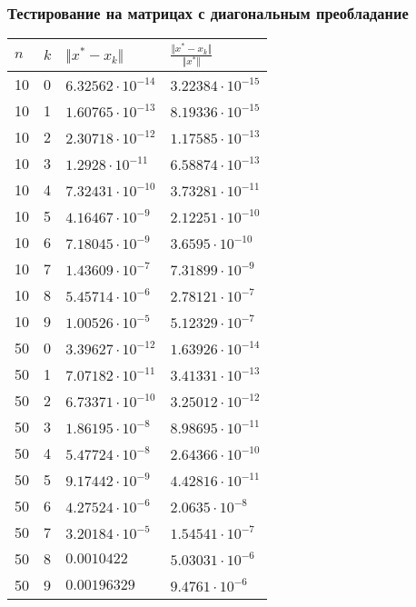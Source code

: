\documentclass[english]{article}
\begin{document}
\subsubsection{Тестирование на матрицах с диагональным преобладание}
\begin{center}
  \begin{longtable}{l|l|l|l}
    \(n\) & \(k\) & \(\Vert x^* - x_k \Vert\) & \(\frac{\Vert x^* - x_k \Vert}{\Vert x^* \Vert}\) \\
    \hline
    10 & 0 & \(6.32562\cdot 10^{-14}\) & \(3.22384\cdot 10^{-15}\) \\
    10 & 1 & \(1.60765\cdot 10^{-13}\) & \(8.19336\cdot 10^{-15}\) \\
    10 & 2 & \(2.30718\cdot 10^{-12}\) & \(1.17585\cdot 10^{-13}\) \\
    10 & 3 & \(1.2928\cdot 10^{-11}\) & \(6.58874\cdot 10^{-13}\) \\
    10 & 4 & \(7.32431\cdot 10^{-10}\) & \(3.73281\cdot 10^{-11}\) \\
    10 & 5 & \(4.16467\cdot 10^{-9}\) & \(2.12251\cdot 10^{-10}\) \\
    10 & 6 & \(7.18045\cdot 10^{-9}\) & \(3.6595\cdot 10^{-10}\) \\
    10 & 7 & \(1.43609\cdot 10^{-7}\) & \(7.31899\cdot 10^{-9}\) \\
    10 & 8 & \(5.45714\cdot 10^{-6}\) & \(2.78121\cdot 10^{-7}\) \\
    10 & 9 & \(1.00526\cdot 10^{-5}\) & \(5.12329\cdot 10^{-7}\) \\
    \hline
    50 & 0 & \(3.39627\cdot 10^{-12}\) & \(1.63926\cdot 10^{-14}\) \\
    50 & 1 & \(7.07182\cdot 10^{-11}\) & \(3.41331\cdot 10^{-13}\) \\
    50 & 2 & \(6.73371\cdot 10^{-10}\) & \(3.25012\cdot 10^{-12}\) \\
    50 & 3 & \(1.86195\cdot 10^{-8}\) & \(8.98695\cdot 10^{-11}\) \\
    50 & 4 & \(5.47724\cdot 10^{-8}\) & \(2.64366\cdot 10^{-10}\) \\
    50 & 5 & \(9.17442\cdot 10^{-9}\) & \(4.42816\cdot 10^{-11}\) \\
    50 & 6 & \(4.27524\cdot 10^{-6}\) & \(2.0635\cdot 10^{-8}\) \\
    50 & 7 & \(3.20184\cdot 10^{-5}\) & \(1.54541\cdot 10^{-7}\) \\
    50 & 8 & \(0.0010422\) & \(5.03031\cdot 10^{-6}\) \\
    50 & 9 & \(0.00196329\) & \(9.4761\cdot 10^{-6}\) \\

\end{longtable}
\end{center}
\end{document}
